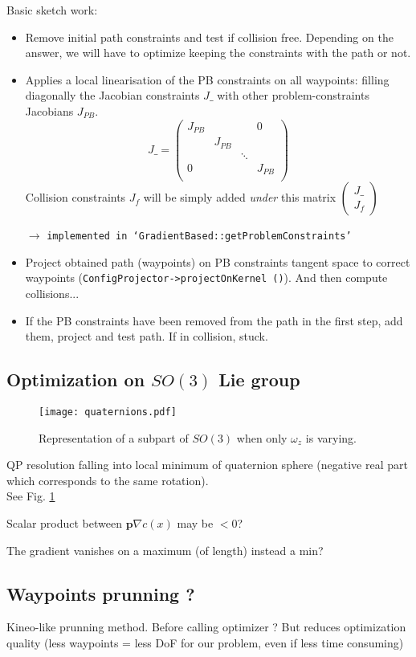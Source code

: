 \documentclass {article}
\begin{document}
Basic sketch work:
\begin{itemize}
\item Remove initial path constraints and test if collision free. Depending on the
answer, we will have to optimize keeping the constraints with the path or not.
\item Applies a local linearisation of the PB constraints on all waypoints: filling
diagonally the Jacobian constraints $J\_$ with other problem-constraints Jacobians $J_{PB}$.
$$
J\_ =
\left(\begin{array}{cccc}
J_{PB} & & &0\\
 & J_{PB} & \\
 &  & \ddots   \\
0& & & J_{PB} \\
\end{array}
\right)
$$
Collision constraints $J_f$ will be simply added \textit{under} this matrix
$
\begin{pmatrix}
J\_ \\
J_f
\end{pmatrix}
$

$\rightarrow$ \texttt{implemented in `GradientBased::getProblemConstraints'}

\item Project obtained path (waypoints) on PB constraints tangent space to correct
waypoints (\texttt{ConfigProjector->projectOnKernel ()}). And then compute collisions...
\item If the PB constraints have been removed from the path in the first step, add
them, project and test path. If in collision, stuck.
\end{itemize}



\vspace{0.4cm}

\subsection{Optimization on $SO(3)$ Lie group}

\begin{figure}[!h]
	\centering
	\texttt{[image: quaternions.pdf]}
	\caption{Representation of a subpart of $SO(3)$ when only $\omega_z$ is
	varying.}
	\label{fig:quaternions}
\end{figure}

QP resolution falling into local minimum of quaternion sphere (negative real part
which corresponds to the same rotation).\\
See Fig. \ref{fig:quaternions}

Scalar product between $\mathbf{p}\nabla c(x)$ may be $<0$?

The gradient vanishes on a maximum (of length) instead a min?

\vspace{0.4cm}

\subsection{Waypoints prunning ?}
Kineo-like prunning method. Before calling optimizer ? But reduces optimization quality
(less waypoints = less DoF for our problem, even if less time consuming)
\end{document}
